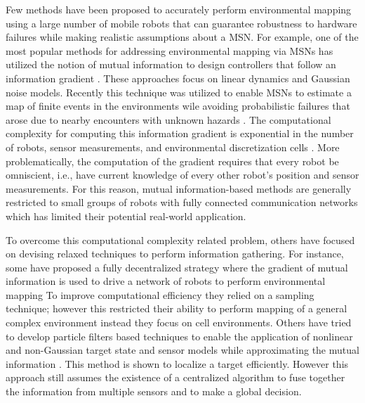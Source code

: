 \documentclass[letterpaper, 10 pt, conference]{ieeeconf}
\begin{document}
Few methods have been proposed to accurately perform environmental mapping using a large number of mobile robots that can guarantee robustness to hardware failures while making realistic assumptions about a MSN.
For example, one of the most popular methods for addressing environmental mapping via MSNs has utilized the notion of mutual information to design controllers that follow an information gradient \cite{cortez2011information,pahlajani2014networked}. 
These approaches focus on linear dynamics and Gaussian noise models. 
Recently this technique was utilized to enable MSNs to estimate a map of finite events in the environments wile avoiding probabilistic failures that arose due to nearby encounters with unknown hazards \cite{schwager2017multi}.
The computational complexity for computing this information gradient is exponential in the number of robots, sensor measurements, and environmental discretization cells \cite{schwager2017multi, julian2012distributed}.
More problematically, the computation of the gradient requires that every robot be omniscient, i.e., have current knowledge of every other robot’s position and sensor measurements.
For this reason, mutual information-based methods are generally restricted to small groups of robots with fully connected communication networks which has limited their potential real-world application. 

To overcome this computational complexity related problem, others have focused on devising relaxed techniques to perform information gathering.
For instance, some have proposed a fully decentralized strategy where the gradient of mutual information is used to drive a network of robots to perform environmental mapping \cite{julian2012distributed}
To improve computational efficiency they relied on a sampling technique; however this restricted their ability to perform mapping of a general complex environment instead they focus on cell environments. 
Others have tried to develop particle filters based techniques to enable the application of nonlinear and non-Gaussian target state and sensor models while approximating the mutual information \cite{hoffman2010mobile}. 
This method is shown to localize a target efficiently.
However this approach still assumes the existence of a centralized algorithm to fuse together the information from multiple sensors and to make a global decision.
\end{document}
